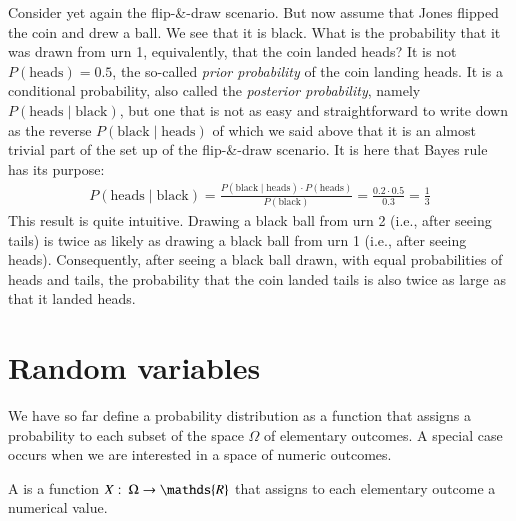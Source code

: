\documentclass[nobib,nofonts]{tufte-handout}
\newcommand{\mult}{\ensuremath{\cdot}}
\begin{document}
Consider yet again the flip-\&-draw scenario. But now assume that Jones flipped the coin and
drew a ball. We see that it is black. What is the probability that it was drawn from urn 1,
equivalently, that the coin landed heads? It is not $P(\text{heads}) = 0.5$, the so-called
\emph{prior probability} of the coin landing heads. It is a conditional probability, also
called the \emph{posterior probability}, namely $P(\text{heads} \mid \text{black})$, but one
that is not as easy and straightforward to write down as the reverse
$P(\text{black} \mid \text{heads})$ of which we said above that it is an almost trivial part of
the set up of the flip-\&-draw scenario. It is here that Bayes rule has its purpose:
\begin{align*}
  P(\text{heads} \mid \text{black}) = \frac{P(\text{black} \mid \text{heads}) \mult P(\text{heads})}{P(\text{black})} =
  \frac{0.2 \mult 0.5}{0.3} = \frac{1}{3}
\end{align*}
This result is quite intuitive. Drawing a black ball from urn 2 (i.e., after seeing tails) is twice
as likely as drawing a black ball from urn 1 (i.e., after seeing heads). Consequently, after
seeing a black ball drawn, with equal probabilities of heads and tails, the probability that
the coin landed tails is also twice as large as that it landed heads.

\section{Random variables}

We have so far define a probability distribution as a function that assigns a probability to
each subset of the space $\Omega$ of elementary outcomes. A special case occurs when we are
interested in a space of numeric outcomes.

A  is a function $X \mycolon \Omega \rightarrow \mathds{R}$ that
assigns to each elementary outcome a numerical value.
\end{document}
